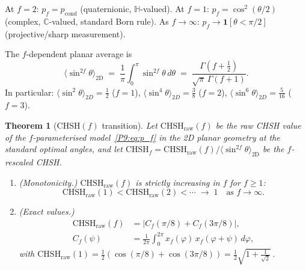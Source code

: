\documentclass[11pt,a4paper]{article}
\newtheorem{theorem}{Theorem}[section]
\theoremstyle{definition}
\theoremstyle{remark}
\newcommand{\CC}{\mathbb{C}}
\newcommand{\HH}{\mathbb{H}}
\newcommand{\pcond}{p_{\mathrm{cond}}}
\newcommand{\CHSH}{\mathrm{CHSH}}
\begin{document}
At $f=2$: $p_f = \pcond$ (quaternionic, $\HH$-valued).
At $f=1$: $p_f = \cos^2(\theta/2)$ (complex, $\CC$-valued, standard Born rule).
As $f\to\infty$: $p_f\to\mathbf{1}[\theta<\pi/2]$ (projective/sharp measurement).
 
The $f$-dependent planar average is
\begin{equation}
  \langle\sin^{2f}\theta\rangle_\mathrm{2D}
  \;=\; \frac{1}{\pi}\int_0^{\pi}\sin^{2f}\theta\,d\theta
  \;=\; \frac{\Gamma(f+\tfrac{1}{2})}{\sqrt{\pi}\,\Gamma(f+1)}.
  \label{P9:eq:sin2f_avg}
\end{equation}
In particular: $\langle\sin^2\theta\rangle_{2D} = \tfrac{1}{2}$ ($f=1$),
$\langle\sin^4\theta\rangle_{2D} = \tfrac{3}{8}$ ($f=2$),
$\langle\sin^6\theta\rangle_{2D} = \tfrac{5}{16}$ ($f=3$).
 
\begin{theorem}[CHSH$(f)$ transition]
\label{P9:thm:chsh_f}
Let $\CHSH_\mathrm{raw}(f)$ be the raw CHSH value of the $f$-parameterised
model~\eqref{P9:eq:p_f} in the 2D planar geometry at the standard optimal angles,
and let $\CHSH_f = \CHSH_\mathrm{raw}(f)/\langle\sin^{2f}\theta\rangle_\mathrm{2D}$
be the $f$-rescaled CHSH.
 
\begin{enumerate}[label=\emph{(\roman*)}]
  \item \emph{(Monotonicity.)}
    $\CHSH_\mathrm{raw}(f)$ is strictly increasing in $f$ for $f\geq1$:
    \begin{equation}
      \CHSH_\mathrm{raw}(1) < \CHSH_\mathrm{raw}(2) < \cdots
      \;\to\; 1 \quad\text{as }f\to\infty.
      \label{P9:eq:CHSH_monotone}
    \end{equation}
 
  \item \emph{(Exact values.)}
    \begin{align}
      \CHSH_\mathrm{raw}(f)
      &= \bigl|C_f(\pi/8) + C_f(3\pi/8)\bigr|,
      \label{P9:eq:CHSH_exact_f}\\
      C_f(\psi)
      &= \frac{1}{2\pi}\int_0^{2\pi} x_f(\varphi)\,x_f(\varphi+\psi)\,d\varphi,
      \nonumber
    \end{align}
    with $\CHSH_\mathrm{raw}(1) = \tfrac{1}{2}(\cos(\pi/8)+\cos(3\pi/8))
    = \tfrac{1}{2}\sqrt{1+\tfrac{1}{\sqrt{2}}}\,$.
 

\end{enumerate}
\end{theorem}
\end{document}
